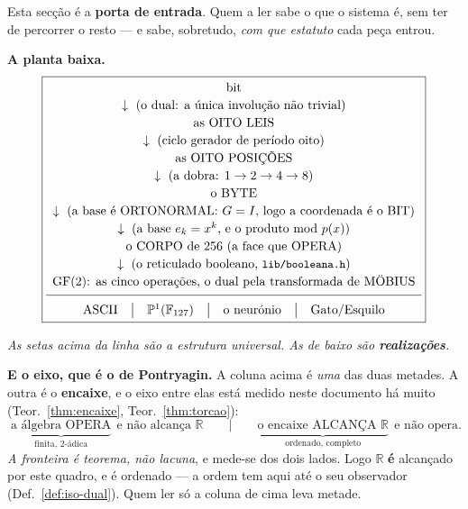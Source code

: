 \documentclass[11pt,a4paper]{article}
\newcommand{\code}[1]{\texttt{\small #1}}
\begin{document}
Esta secção é a \textbf{porta de entrada}. Quem a ler sabe o que o
sistema é, sem ter de percorrer o resto --- e sabe, sobretudo,
\emph{com que estatuto} cada peça entrou.

\medskip
\noindent\textbf{A planta baixa.}
\[
\boxed{
\begin{array}{c}
\text{bit}\\[2pt]
\downarrow\ \text{(o dual: a única involução não trivial)}\\[2pt]
\text{as OITO LEIS}\\[2pt]
\downarrow\ \text{(ciclo gerador de período oito)}\\[2pt]
\text{as OITO POSIÇÕES}\\[2pt]
\downarrow\ \text{(a dobra: }1\to2\to4\to8)\\[2pt]
\text{o BYTE}\\[2pt]
\downarrow\ \text{(a base é ORTONORMAL: }G=I\text{, logo a coordenada é o BIT)}\\[2pt]
\downarrow\ \text{(a base }e_k=x^{k}\text{, e o produto mod }p(x))\\[2pt]
\text{o CORPO de }256\ \text{(a face que OPERA)}\\[2pt]
\downarrow\ \text{(o reticulado booleano, }\code{lib/booleana.h})\\[2pt]
\text{GF}(2)\text{: as cinco operações, o dual pela transformada de MÖBIUS}\\[4pt]
\hline\\[-6pt]
\text{ASCII}\quad\big|\quad\mathbb{P}^1(\mathbb{F}_{127})
\quad\big|\quad\text{o neurónio}\quad\big|\quad\text{Gato}/\text{Esquilo}
\end{array}}
\]
\begin{center}\small
\emph{As setas acima da linha são a estrutura universal.
As de baixo são \textbf{realizações}.}
\end{center}

\medskip
\noindent\textbf{E o eixo, que é o de Pontryagin.} A coluna acima é
\emph{uma} das duas metades. A outra é o \textbf{encaixe}, e o eixo entre
elas está medido neste documento há muito
(Teor.~\ref{thm:encaixe}, Teor.~\ref{thm:torcao}):
\[
\boxed{\;
\underbrace{\text{a álgebra OPERA}}_{\text{finita, }2\text{-ádica}}
\ \ \text{e não alcança }\mathbb{R}
\qquad\Big|\qquad
\underbrace{\text{o encaixe ALCANÇA }\mathbb{R}}_{\text{ordenado, completo}}
\ \ \text{e não opera.}\;}
\]
\emph{A fronteira é teorema, não lacuna}, e mede-se dos dois lados. Logo
$\mathbb{R}$ \textbf{é} alcançado por este quadro, e é ordenado --- a
ordem tem aqui até o seu observador (Def.~\ref{def:iso-dual}). Quem ler
só a coluna de cima leva metade.
\end{document}
